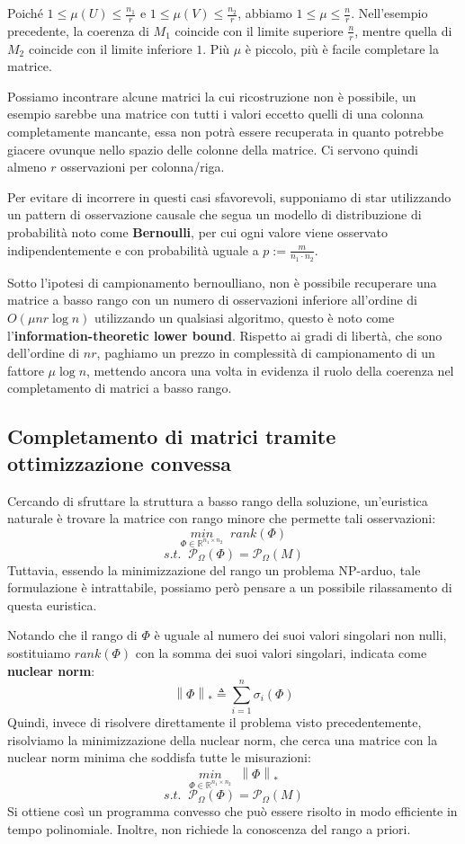 \documentclass[12pt,a4paper]{report}
\newcommand{\nukenorm}[1]{\left\lVert#1\right\rVert _*}
\begin{document}
Poiché $1\leq \mu(U) \leq \frac{n_1}{r}$
e $1\leq \mu(V) \leq \frac{n_2}{r}$, abbiamo $1\leq \mu \leq \frac{n}{r}$.
Nell'esempio precedente, la coerenza di $M_1$ coincide con il limite superiore
$\frac{n}{r}$, mentre quella di $M_2$ coincide con il limite inferiore $1$.
Più $\mu$ è piccolo, più è facile completare la matrice.

Possiamo incontrare alcune matrici la cui ricostruzione non è possibile,
un esempio sarebbe una matrice con tutti i valori eccetto quelli di una colonna completamente
mancante, essa non potrà essere recuperata in quanto potrebbe giacere ovunque nello
spazio delle colonne della matrice.
Ci servono quindi almeno $r$ osservazioni per colonna/riga.

Per evitare di incorrere in questi casi sfavorevoli, supponiamo di star utilizzando
un pattern di osservazione causale che segua un modello di distribuzione di probabilità
noto come \textbf{Bernoulli}, per cui ogni valore viene osservato indipendentemente
e con probabilità uguale a $p := \frac{m}{n_1\cdot n_2}$.

Sotto l'ipotesi di campionamento bernoulliano,
non è possibile recuperare una matrice a basso rango con un numero di osservazioni
inferiore all'ordine di $O(\mu n r \log n)$ utilizzando un qualsiasi algoritmo,
questo è noto come l'\textbf{information-theoretic lower bound}.
Rispetto ai gradi di libertà, che sono dell'ordine di $nr$,
paghiamo un prezzo in complessità di campionamento di un fattore $\mu \log n$,
mettendo ancora una volta in evidenza il ruolo della coerenza nel completamento di matrici a basso rango.

\newpage

\subsection{Completamento di matrici tramite ottimizzazione convessa}

Cercando di sfruttare la struttura a basso rango della soluzione, un'euristica naturale
è trovare la matrice con rango minore che permette tali osservazioni:
$$ \underset{\Phi \in \mathbb{R}^{n_1 \times n_2}}{min}\;\; rank(\Phi) $$
$$ s.t. \;\;  \mathcal{P}_{\Omega}(\Phi) = \mathcal{P}_{\Omega}(M) $$ 
Tuttavia, essendo la minimizzazione del rango un problema NP-arduo,
tale formulazione è intrattabile, possiamo però
pensare a un possibile rilassamento di questa euristica.

Notando che il rango di $\Phi$ è uguale al numero dei suoi valori singolari non nulli,
sostituiamo $rank(\Phi)$ con la somma dei suoi valori singolari, indicata come \textbf{nuclear norm}:
$$ \nukenorm{\Phi} \triangleq \sum_{i=1}^n \sigma_i(\Phi) $$
Quindi, invece di risolvere direttamente il problema visto precedentemente,
risolviamo la minimizzazione della nuclear norm, che cerca una matrice con la nuclear norm
minima che soddisfa tutte le misurazioni:
$$ \underset{\Phi \in \mathbb{R}^{n_1 \times n_2}}{min}\;\; \nukenorm{\Phi} $$
$$ s.t. \;\;  \mathcal{P}_{\Omega}(\Phi) = \mathcal{P}_{\Omega}(M) $$ 
Si ottiene così un programma convesso che può
essere risolto in modo efficiente in tempo polinomiale.
Inoltre, non richiede la conoscenza
del rango a priori.
\end{document}
